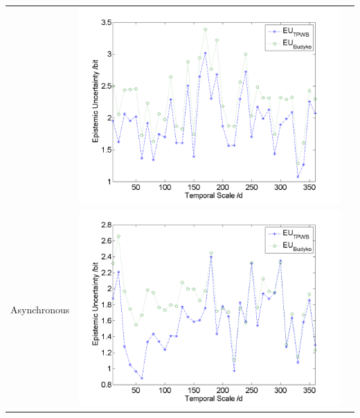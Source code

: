 \documentclass[draft,wrr]{AGUTeX}
\begin{document}
\begin{article}
\begin{table}[H]
{\begin{tabular}{ccc}
&\begin{minipage}{.6\textwidth}\includegraphics[width=\linewidth]{resultgraph/06810000EU.png}\end{minipage}
\\
Asynchronous
&\begin{minipage}{.6\textwidth}\includegraphics[width=\linewidth]{resultgraph/02143000EU.png}\end{minipage}
 

\end{tabular}}
\end{table}
\end{article}
\end{document}
